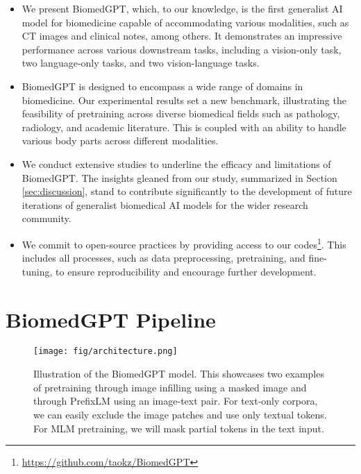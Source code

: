 \documentclass[10pt]{article} \usepackage[preprint]{tmlr}
\begin{document}
\begin{itemize}[noitemsep]
    \item We present BiomedGPT, which, to our knowledge, is the first generalist AI model for biomedicine capable of accommodating various modalities, such as CT images and clinical notes, among others. It demonstrates an impressive performance across various downstream tasks, including a vision-only task, two language-only tasks, and two vision-language tasks.
    \item BiomedGPT is designed to encompass a wide range of domains in biomedicine. Our experimental results set a new benchmark, illustrating the feasibility of pretraining across diverse biomedical fields such as pathology, radiology, and academic literature. This is coupled with an ability to handle various body parts across different modalities.
    \item We conduct extensive studies to underline the efficacy and limitations of BiomedGPT. The insights gleaned from our study, summarized in Section \ref{sec:discussion}, stand to contribute significantly to the development of future iterations of generalist biomedical AI models for the wider research community.
    \item We commit to open-source practices by providing access to our codes\footnote{\url{https://github.com/taokz/BiomedGPT}}. This includes all processes, such as data preprocessing, pretraining, and fine-tuning, to ensure reproducibility and encourage further development.
\end{itemize}




\section{BiomedGPT Pipeline}


\begin{figure*}
    \centering
    \texttt{[image: fig/architecture.png]}
    \caption{Illustration of the BiomedGPT model. This showcases two examples of pretraining through image infilling using a masked image and through PrefixLM \citep{wangsimvlm} using an image-text pair. For text-only corpora, we can easily exclude the image patches and use only textual tokens. For MLM pretraining, we will mask partial tokens in the text input.}
    \label{fig:arch}
    \vskip -0.4cm
\end{figure*}
\end{document}
